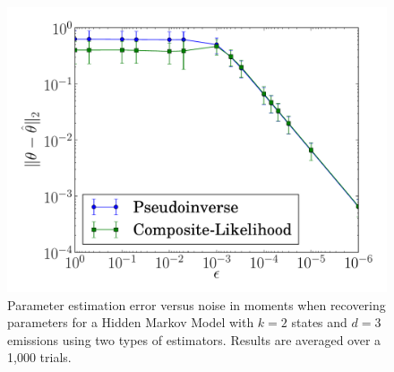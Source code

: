 %


\begin{figure}
  \centering
  \includegraphics[width=0.8\columnwidth]{figures/asymp.pdf}
  \caption{Parameter estimation error versus noise in moments when recovering parameters for a Hidden
  Markov Model with $k=2$ states and $d=3$ emissions using two types of estimators. Results are averaged over a 1,000 trials.}
    \label{fig:cl-hmm}
\end{figure}
